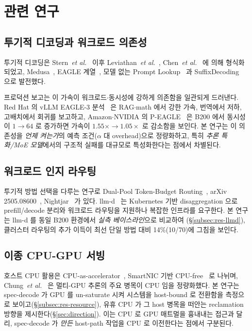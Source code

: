 
\section{관련 연구}
\label{sec:related}

\subsection{투기적 디코딩과 워크로드 의존성}

투기적 디코딩은 Stern~\emph{et al.}~\cite{stern2018blockwise} 이후
Leviathan~\emph{et al.}~\cite{leviathan2023spec},
Chen~\emph{et al.}~\cite{chen2023spec} 에 의해 형식화되었고,
Medusa~\cite{cai2024medusa}, EAGLE 계열~\cite{li2024eagle,li2025eagle3},
모델 없는 Prompt Lookup~\cite{saxena2024prompt} 과
SuffixDecoding~\cite{snowflake-arctic} 으로 발전했다.

프로덕션 보고는 이 가속이 워크로드$\cdot$동시성에 강하게 의존함을 일관되게 드러낸다.
Red Hat 의 vLLM EAGLE-3 분석~\cite{redhat2025eagle3vllm} 은 RAG$\cdot$math 에서 강한 가속,
번역에서 저하, 고배치에서 회귀를 보고하고,
Amazon$\cdot$NVIDIA 의 P-EAGLE~\cite{peagle2026vllm} 은 B200 에서 동시성이
$1\to64$ 로 증가하면 가속이 $1.55\times\to1.05\times$ 로 감소함을 보인다.
본 연구는 이 의존성을 \emph{언제 켜는가}의 예측 조건($\alpha$ 대 overhead)으로
정량화하고, 특히 \emph{추론 특화/MoE 모델}에서의 구조적 실패를
대규모로 특성화한다는 점에서 차별된다.

\subsection{워크로드 인지 라우팅}

투기적 방법 선택을 다루는 연구로
Dual-Pool Token-Budget Routing~\cite{liu2026dualpool},
arXiv 2505.08600~\cite{specrouting2025}, Nightjar~\cite{nightjar2025} 가 있다.
llm-d~\cite{llmd2025} 는 Kubernetes 기반 disaggregation 으로
prefill/decode 분리와 워크로드 라우팅을 지원하나 복잡한 인프라를 요구한다.
본 연구는 llm-d 를 동일 B200 환경에서 \emph{실측 베이스라인}으로 비교하여
(\S\ref{subsec:res-llmd}), 클러스터 라우팅의 추가 이득이
최선 단일 방법 대비 14\%(10/70)에 그침을 보인다.

\subsection{이종 CPU-GPU 서빙}

호스트 CPU 활용은 CPU-as-accelerator~\cite{xu2026arclight},
SmartNIC 기반 CPU-free~\cite{siavashi2026blink} 로 나뉘며,
Chung~\emph{et al.}~\cite{chung2026cpuslowdowns} 은 멀티-GPU 추론의 주요 병목이
CPU 임을 정량화했다. 본 연구는 spec-decode 가 GPU 를 un-saturate 시켜
시스템을 host-bound 로 전환함을 측정으로 보이고(\S\ref{subsec:res-resource}),
유휴 CPU 가 그 host 병목을 떠안는 reclamation 방향을 제시한다(\S\ref{sec:direction}).
이는 CPU 로 GPU 매트멀을 흉내내는 접근과 달리, spec-decode 가 \emph{만든}
host-path 작업을 CPU 로 이전한다는 점에서 구분된다.
